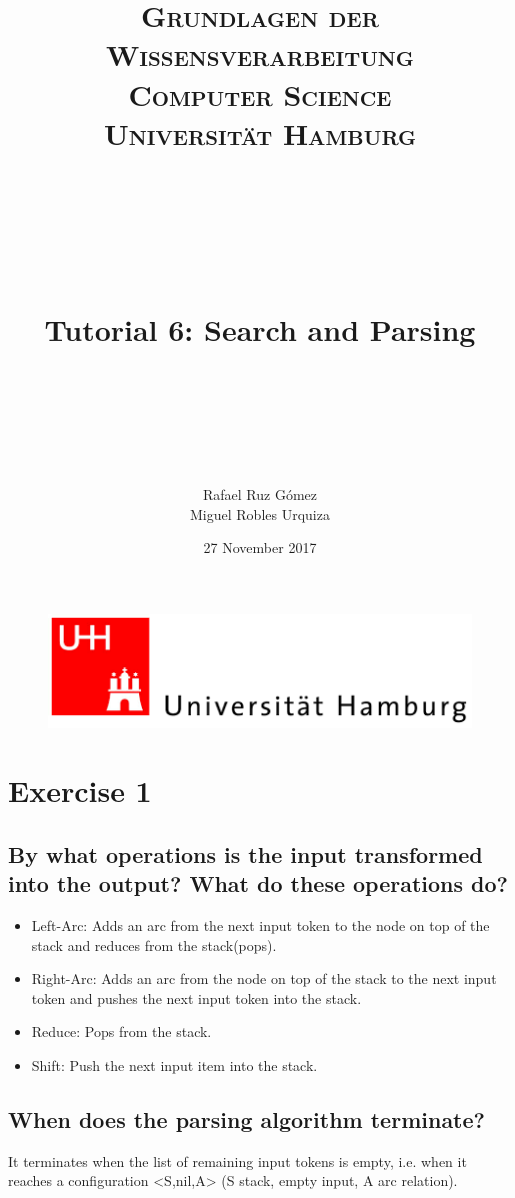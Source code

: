 \documentclass[paper=a4, fontsize=11pt]{scrartcl} %
\title{	
\normalfont \normalsize 
\textsc{\textbf{Grundlagen der Wissensverarbeitung} \\ Computer Science \\ Universität Hamburg} \\ [25pt] %
~\\
~\\
~\\
\horrule{0.5pt} \\[0.4cm] %
\Huge Tutorial 6: Search and Parsing \\ %
\horrule{2pt} \\[0.5cm] %
~\\
~\\
}
\author{Rafael Ruz Gómez\\Miguel Robles Urquiza} %
\date{\normalsize 27 November 2017} %
\numberwithin{equation}{section} %
\numberwithin{figure}{section} %
\numberwithin{table}{section} %
\begin{document}
\maketitle %

\begin{figure}
	\centering
	\includegraphics[scale=0.8]{logo_uni_hamburg.png}
\end{figure}

\newpage %





\section{Exercise 1}

\subsection{By what operations is the input transformed into the output? What do these operations do?}

\begin{itemize}
	\item Left-Arc: Adds an arc from the next input token to the node on top of the stack and reduces from the stack(pops).
	\item Right-Arc: Adds an arc from the node on top of the stack to the next input token and pushes the next input token into the stack.
	\item Reduce: Pops from the stack.
	\item Shift: Push the next input item into the stack.
\end{itemize}

\subsection{When does the parsing algorithm terminate?}

It terminates when the list of remaining input tokens is empty, i.e. when it reaches a configuration <S,nil,A> (S stack, empty input, A arc relation).
\end{document}
